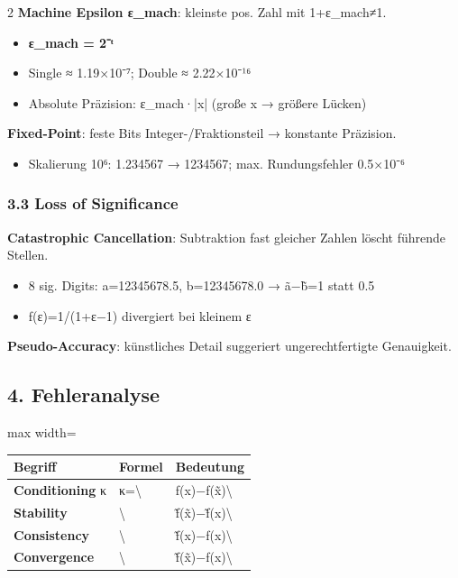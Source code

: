 \documentclass[10pt, a4paper]{article}
\begin{document}
\begin{multicols}{2}
\textbf{Machine Epsilon ε\_mach}: kleinste pos. Zahl mit 1+ε\_mach≠1.

\begin{itemize}
  \item \textbf{ε\_mach = 2⁻ᵗ}
  \item Single ≈ 1.19×10⁻⁷; Double ≈ 2.22×10⁻¹⁶
  \item Absolute Präzision: ε\_mach·|x| (große x → größere Lücken)
\end{itemize}

\textbf{Fixed-Point}: feste Bits Integer-/Fraktionsteil → konstante Präzision.

\begin{itemize}
  \item Skalierung 10⁶: 1.234567 → 1234567; max. Rundungsfehler 0.5×10⁻⁶
\end{itemize}


\subsubsection{3.3 Loss of Significance}
\textbf{Catastrophic Cancellation}: Subtraktion fast gleicher Zahlen löscht führende Stellen.

\begin{itemize}
  \item 8 sig. Digits: a=12345678.5, b=12345678.0 → ã−b̃=1 statt 0.5
  \item f(ε)=1/(1+ε−1) divergiert bei kleinem ε
\end{itemize}

\textbf{Pseudo-Accuracy}: künstliches Detail suggeriert ungerechtfertigte Genauigkeit.



\subsection{4. Fehleranalyse}


{\small
\begin{adjustbox}{max width=\linewidth}
{\scriptsize
\begin{tabular}{lll}
\toprule
\textbf{Begriff} & \textbf{Formel} & \textbf{Bedeutung} \\
\midrule
\textbf{Conditioning} κ & κ=\textbackslash{} & f(x)−f(x̃)\textbackslash{} \\
\textbf{Stability} & \textbackslash{} & f̃(x̃)−f̃(x)\textbackslash{} \\
\textbf{Consistency} & \textbackslash{} & f̃(x)−f(x)\textbackslash{} \\
\textbf{Convergence} & \textbackslash{} & f̃(x̃)−f(x)\textbackslash{} \\
\bottomrule
\end{tabular}
}
\end{adjustbox}
}



\end{multicols}
\end{document}
